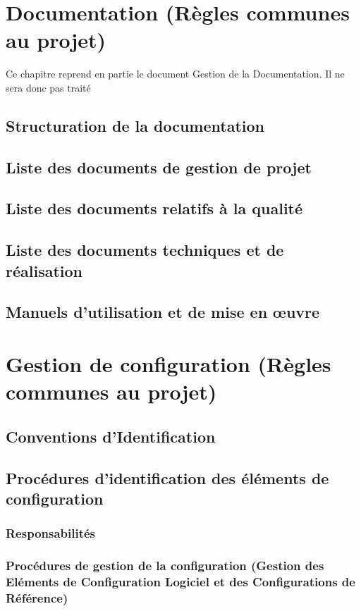 \section{Documentation (Règles communes au projet)}
\begin{center} \begin{Large}Ce chapitre reprend en partie le document Gestion de la Documentation. Il ne sera donc pas traité\end{Large}  \end{center}
\subsection{Structuration de la documentation}
\subsection{Liste des documents de gestion de projet}
\subsection{Liste des documents relatifs à la qualité}
\subsection{Liste des documents techniques et de réalisation}
\subsection{Manuels d’utilisation et de mise en œuvre}

\section{Gestion de configuration (Règles communes au projet)}
\subsection{Conventions d’Identification}
\subsection{Procédures d’identification des éléments de configuration} 
\subsubsection{Responsabilités}
\subsubsection{Procédures de gestion de la configuration (Gestion des Eléments de Configuration Logiciel et des Configurations de Référence)}
